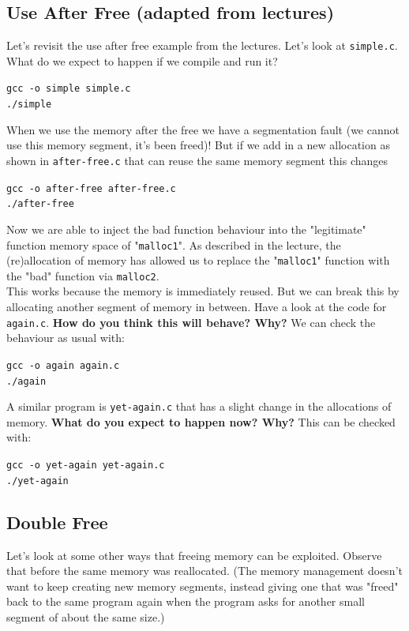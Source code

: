 \documentclass{article}
\begin{document}
\subsection{Use After Free (adapted from lectures)}
Let's revisit the use after free example from the lectures. Let's look at \lstinline{simple.c}. What do we expect to happen if we compile and run it?
\begin{center}
    \lstinline{gcc -o simple simple.c}\\
    \lstinline{./simple}
\end{center}
\noindent When we use the memory after the free we have a segmentation fault (we
cannot use this memory segment, it's been freed)!
But if we add in a new allocation as shown in \lstinline{after-free.c} that can reuse
the same memory segment this changes
\begin{center}
    \lstinline{gcc -o after-free after-free.c}\\
    \lstinline{./after-free}
\end{center}
\noindent Now we are able to inject the bad function behaviour into the "legitimate" function memory space of "\lstinline{malloc1}". As described in the lecture,
the (re)allocation of memory has allowed us to replace the "\lstinline{malloc1}" function with the "bad" function via \lstinline{malloc2}.\\

\noindent This works because the memory is immediately reused. But we can break this by allocating another segment of memory in between. Have a look at the code for \lstinline{again.c}. \textbf{How do you think this will behave? Why?} We can check the behaviour as usual with:
\begin{center}
    \lstinline{gcc -o again again.c}\\
    \lstinline{./again}
\end{center}
\noindent A similar program is \lstinline{yet-again.c} that has a slight change in the allocations of memory. \textbf{What do you expect to happen now? Why?} This can be checked with:
\begin{center}
    \lstinline{gcc -o yet-again yet-again.c}\\
    \lstinline{./yet-again}
\end{center}



\subsection{Double Free}
Let's look at some other ways that freeing memory can be exploited. Observe
that before the same memory was reallocated. (The memory management
doesn't want to keep creating new memory segments, instead giving one
that was "freed" back to the same program again when the program asks for
another small segment of about the same size.)\\
\end{document}
